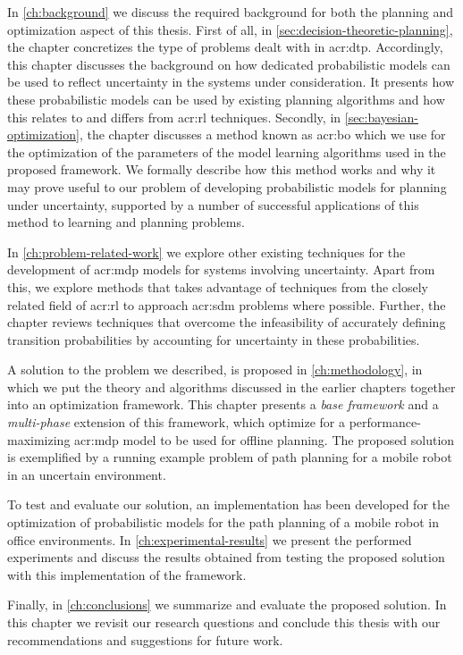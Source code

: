 In \autoref{ch:background} we discuss the required background for both the planning and optimization aspect of this thesis.
First of all, in \autoref{sec:decision-theoretic-planning}, the chapter concretizes the type of problems dealt with in \acrshort{acr:dtp}. 
Accordingly, this chapter discusses the background on how dedicated probabilistic models can be used to reflect uncertainty in the systems under consideration.
It presents how these probabilistic models can be used by existing planning algorithms and how this relates to and differs from \acrshort{acr:rl} techniques.
Secondly, in \autoref{sec:bayesian-optimization}, the chapter discusses a method known as \acrlong{acr:bo} which we use for the optimization of the parameters of the model learning algorithms used in the proposed framework.
We formally describe how this method works and why it may prove useful to our problem of developing probabilistic models for planning under uncertainty, supported by a number of successful applications of this method to learning and planning problems.

In \autoref{ch:problem-related-work} we explore other existing techniques for the development of \acrshort{acr:mdp} models for systems involving uncertainty.
Apart from this, we explore methods that takes advantage of techniques from the closely related field of \acrshort{acr:rl} to approach \acrshort{acr:sdm} problems where possible.
Further, the chapter reviews techniques that overcome the infeasibility of accurately defining transition probabilities by accounting for uncertainty in these probabilities.

A solution to the problem we described, is proposed in \autoref{ch:methodology}, in which we put the theory and algorithms discussed in the earlier chapters together into an optimization framework.
This chapter presents a \textit{base framework} and a \textit{multi-phase} extension of this framework, which optimize for a performance-maximizing \acrshort{acr:mdp} model to be used for offline planning.
The proposed solution is exemplified by a running example problem of path planning for a mobile robot in an uncertain environment.

To test and evaluate our solution, an implementation has been developed for the optimization of probabilistic models for the path planning of a mobile robot in office environments.
In \autoref{ch:experimental-results} we present the performed experiments and discuss the results obtained from testing the proposed solution with this implementation of the framework.

Finally, in \autoref{ch:conclusions} we summarize and evaluate the proposed solution. In this chapter we revisit our research questions and conclude this thesis with our recommendations and suggestions for future work.

%
